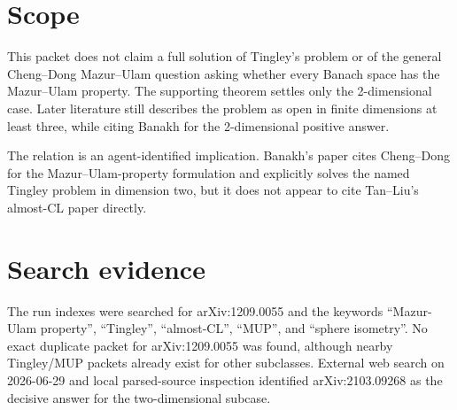 \documentclass[11pt]{article}
\begin{document}
\section*{Scope}

This packet does not claim a full solution of Tingley's problem or of the
general Cheng--Dong Mazur--Ulam question asking whether every Banach
space has the Mazur--Ulam property.  The supporting theorem settles only
the 2-dimensional case.  Later literature still describes the problem as
open in finite dimensions at least three, while citing Banakh for the
2-dimensional positive answer.

The relation is an agent-identified implication.  Banakh's paper cites
Cheng--Dong for the Mazur--Ulam-property formulation and explicitly
solves the named Tingley problem in dimension two, but it does not appear
to cite Tan--Liu's almost-CL paper directly.

\section*{Search evidence}

The run indexes were searched for arXiv:1209.0055 and the keywords
``Mazur-Ulam property'', ``Tingley'', ``almost-CL'', ``MUP'', and
``sphere isometry''.  No exact duplicate packet for arXiv:1209.0055 was
found, although nearby Tingley/MUP packets already exist for other
subclasses.  External web search on 2026-06-29 and local parsed-source
inspection identified arXiv:2103.09268 as the decisive answer for the
two-dimensional subcase.
\end{document}
